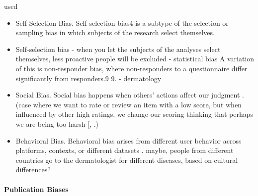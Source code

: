 \begin{refsection}
		\rawcitationstart
		used
		\begin{itemize}		
			\rawcitationusedstart
			\item Self-Selection Bias. Self-selection bias4 is a subtype of the selection or sampling bias in which subjects of the research select themselves. \autocite{Mehrabi_2021}
			\item Self-selection bias - when you let the subjects of the analyses select themselves, less proactive people will be excluded  \autocites{Mester_2022}{Mester_2017}- statistical bias
			A variation of this is non-responder bias, where non-responders to a questionnaire differ significantly from responders.9 9. \autocite{Chakraborty_2024} - dermatology
			
			\item Social Bias. Social bias happens when others’ actions affect our judgment \autocite{M9_Baeza-Yates_2018}. (case where we want to rate or review an item with a low score, but when influenced by other high ratings, we change our scoring thinking that perhaps we are being too harsh [\autocite{M9_Baeza-Yates_2018}, \autocite{M151_Wang_2014}.) \autocite{Mehrabi_2021}
			
			\item Behavioral Bias. Behavioral bias arises from different user behavior across platforms, contexts, or different datasets \autocite{M120_Olteanu_2019}. \autocite{Mehrabi_2021} maybe, people from different countries go to the dermatologist for different diseases, based on cultural differences?
			\rawcitationusedend
			
		\end{itemize}
		\rawcitationend
		
		\paragraph{Publication Biases}
		

\end{refsection}
